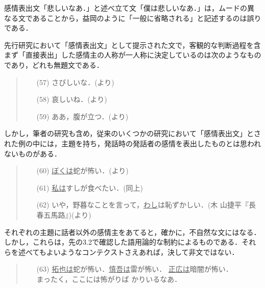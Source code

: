 感情表出文「悲しいなあ．」と述べ立て文「僕は悲しいなあ．」は，ムードの異
なる文であることから，益岡のように「一般に省略される」と記述するのは誤り
である．

先行研究において「感情表出文」として提示された文で，客観的な判断過程を含
まず「直接表出」した感情主の人称が一人称に決定しているのは次のようなもの
であり，どれも無題文である．

\begin{quote}
\begin{itemize}
 \item[(57)] さびしいな．(\cite{寺村1984}より)
 \item[(58)] 哀しいね．(\cite{益岡1991}より)
 \item[(59)] ああ，腹が立つ．(\cite{山岡1997}より)
\end{itemize}
\end{quote}
\vspace{0.3cm}

しかし，筆者の研究も含め，従来のいくつかの研究において「感情表出文」とさ
れた例の中には，主題を持ち，発話時の発話者の感情を表出したものとは思われ
ないものがある．

\vspace{0.3cm}
\begin{quote}
\begin{itemize}
 \item[(60)] \underline{ぼくは}蛇が怖い．(\cite{寺村1973}より)
 \item[(61)] \underline{私は}すしが食べたい．(同上)
 \item[(62)] いや，野暮なことを言って，\underline{わし}は恥ずかしい．(木
	     山捷平『長春五馬路』)(\cite{東1997}より)
\end{itemize}
\end{quote}
\vspace{0.3cm}

それぞれの主題に話者以外の感情主をあてると，確かに，不自然な文にはなる．
しかし，これらは，先の3.2で確認した語用論的な制約によるものである．それ
らを述べてもよいようなコンテクストさえあれば，決して非文ではない．
 
\vspace{0.3cm}
\begin{quote}
\begin{itemize}
 \item[(63)] \underline{拓也は}蛇が怖い．\underline{慎吾は}雷が怖い．
	     \underline{正広は}暗闇が怖い．\\まったく，ここには怖がりば
	     かりいるなあ．
\end{itemize}
\end{quote}
\vspace{0.3cm}

